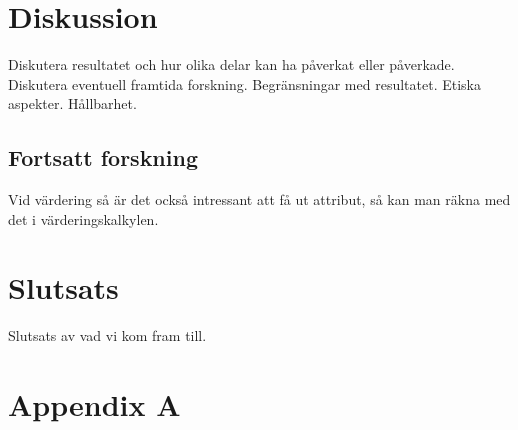 \documentclass[]{kththesis}
\begin{document}
\chapter{Diskussion}
Diskutera resultatet och hur olika delar kan ha påverkat eller påverkade. Diskutera eventuell framtida forskning. Begränsningar med resultatet. Etiska aspekter. Hållbarhet.

\section{Fortsatt forskning}
Vid värdering så är det också intressant att få ut attribut, så kan man räkna med det i värderingskalkylen.

\chapter{Slutsats}
Slutsats av vad vi kom fram till.

\printbibliography[heading=bibintoc]
\appendix
  \chapter{Appendix A}

\tailmatter
\end{document}
